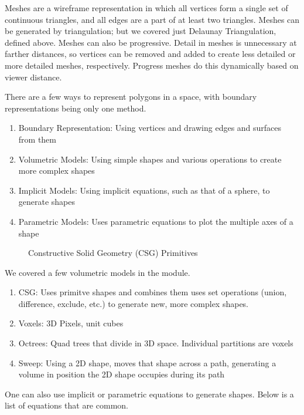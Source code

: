 Meshes are a wireframe representation in which all vertices form a single set of continuous triangles, and all edges are a part of at least two triangles. Meshes can be generated by triangulation; but we covered just Delaunay Triangulation, defined above.
Meshes can also be progressive. Detail in meshes is unnecessary at farther distances, so vertices can be removed and added to create less detailed or more detailed meshes, respectively. Progress meshes do this dynamically based on viewer distance.

There are a few ways to represent polygons in a space, with boundary representations being only one method.
\begin{enumerate}
	\item Boundary Representation: Using vertices and drawing edges and surfaces from them
	\item Volumetric Models: Using simple shapes and various operations to create more complex shapes
	\item Implicit Models: Using implicit equations, such as that of a sphere, to generate shapes
	\item Parametric Models: Uses parametric equations to plot the multiple axes of a shape
\end{enumerate}
   \begin{figure}[!htb]
	\caption{\label{fig:csg} Constructive Solid Geometry (CSG) Primitives}
\end{figure}
We covered a few volumetric models in the module.
\begin{enumerate}
	\item CSG: Uses primitve shapes and combines them uses set operations (union, difference, exclude, etc.) to generate new, more complex shapes.
	\item Voxels: 3D Pixels, unit cubes
	\item Octrees: Quad trees that divide in 3D space. Individual partitions are voxels
	\item Sweep: Using a 2D shape, moves that shape across a path, generating a volume in position the 2D shape occupies during its path
\end{enumerate}
One can also use implicit or parametric equations to generate shapes. Below is a list of equations that are common.
